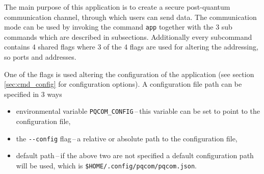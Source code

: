 The main purpose of this application is to create a secure post-quantum communication channel, through which users can send data. The communication mode can be used by invoking the command \texttt{app} together with the 3 sub commands which are described in subsections. Additionally every subcommand contains 4 shared flags where 3 of the 4 flags are used for altering the addressing, so ports and addresses.

One of the flags is used altering the configuration of the application (see section \ref{sec:cmd_config} for configuration options). A configuration file path can be specified in 3 ways
\newpage
\begin{itemize}
  \item environmental variable \texttt{PQCOM\_CONFIG}\,--\,this variable can be set to point to the configuration file,
  \item the \texttt{-\--config} flag\,--\,a relative or absolute path to the configuration file,
  \item default path\,--\,if the above two are not specified a default configuration path will be used, which is \texttt{\$HOME/.config/pqcom/pqcom.json}.
\end{itemize}
